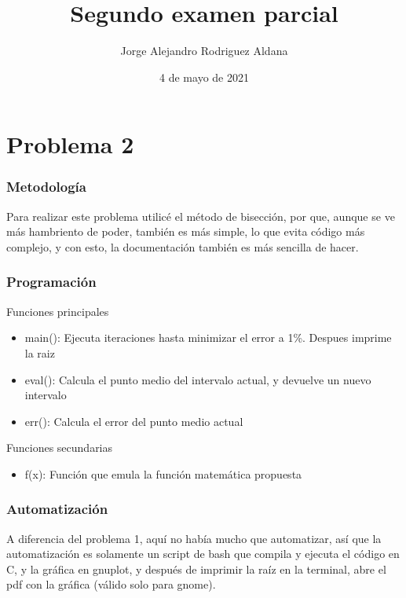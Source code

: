 \documentclass{beamer}
\title{Segundo examen parcial}
\date{4 de mayo de 2021}
\author{Jorge Alejandro Rodriguez Aldana}
\institute{Escuela de Ciencias físicas y matemáticas}
\begin{document}
\maketitle
\section{Problema 2}

\begin{frame}
    \frametitle{Metodología}

    Para realizar este problema utilicé el método de bisección, por que, aunque se ve más hambriento de poder, también es más simple, lo que evita código más complejo, y con esto, la documentación también es más sencilla de hacer.   
    

\end{frame}

\begin{frame}
    \frametitle{Programación}

    \begin{block}{Funciones principales}
        \begin{itemize}[<+- | alert@+>]
            \item main(): Ejecuta iteraciones hasta minimizar el error a 1\%. Despues imprime la raiz
            \item eval(): Calcula el punto medio del intervalo actual, y devuelve un nuevo intervalo
            \item err(): Calcula el error del punto medio actual
        \end{itemize}
    \end{block}


    \begin{block}{Funciones secundarias}
        \begin{itemize}[<+- | alert@+>]
            \item f(x): Función que emula la función matemática propuesta
        \end{itemize}
    \end{block}

\end{frame}

\begin{frame}
    \frametitle{Automatización}

    A diferencia del problema 1, aquí no había mucho que automatizar, así que la automatización es solamente un script de bash que compila y ejecuta el código en C, y la gráfica en gnuplot, y después de imprimir la raíz en la terminal, abre el pdf con la gráfica (válido solo para gnome).

\end{frame}
\end{document}
